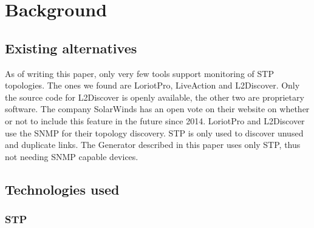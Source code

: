\chapter{Background}
\section{Existing alternatives}
As of writing this paper, only very few tools support monitoring of STP topologies.
The ones we found are LoriotPro\cite{LoriotPro}, LiveAction\cite{LiveAction} and L2Discover\cite{L2Discover}.
Only the source code for L2Discover is openly available, the other two are proprietary software.
The company SolarWinds has an open vote on their website on whether or not to include this feature in the future since 2014\cite{thwackSW}.
LoriotPro and L2Discover use the SNMP for their topology discovery.
STP is only used to discover unused and duplicate links.
The Generator described in this paper uses only STP, thus not needing SNMP capable devices.

\section{Technologies used}
\subsection{STP}
